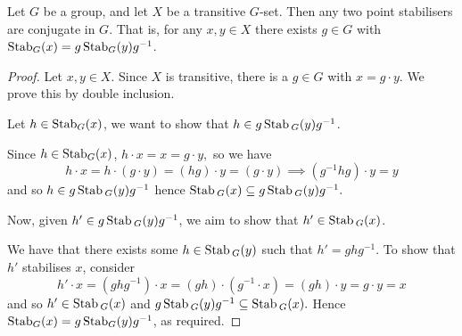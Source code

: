 \begin{theorem}
  Let $G$ be a group, and let $X$ be a transitive $G$-set. Then any two point stabilisers are conjugate in $G$. That is, for any $x,y\in X$ there exists $g\in G$ with
  $\operatorname*{Stab}_G(x)=g\operatorname*{Stab}_G(y)g^{-1}$.
  \label{conjugatestab}
\end{theorem}
\begin{proof}
  Let $x,y \in X$. Since $X$ is transitive, there is a $g\in G$ with $x=g \cdot y$. We prove this by double inclusion.
  
 Let $h\in\operatorname*{Stab}_G(x)$, we want to show that $h\in g\operatorname*{Stab}{}_G(y)g^{-1}$.
  
  Since $h \in \operatorname*{Stab}_G(x)$, $h\cdot x=x=g\cdot y,$ so we have
  $$
  h \cdot x = h \cdot (g \cdot y) = (hg) \cdot y = (g \cdot y) \implies (g^{-1}hg) \cdot y = y  
  $$
  and so $h \in g\operatorname*{Stab}{}_G(y)g^{-1}$ hence $\operatorname*{Stab}{}_G(x) \subseteq g\operatorname*{Stab}{}_G(y)g^{-1}.$

  


 Now, given $h' \in g\operatorname*{Stab}{}_G(y)g^{-1}$, we aim to show that $h' \in \operatorname*{Stab}{}_G(x)$.

We have that there exists some $h \in \operatorname*{Stab}{}_G(y)$ such that $h' = ghg^{-1}$. To show that $h'$ stabilises $x$, consider
$$
h' \cdot x = (ghg^{-1}) \cdot x = (gh) \cdot (g^{-1} \cdot x) = (gh) \cdot y = g \cdot y = x
$$
and so $h' \in \operatorname*{Stab}{}_G(x)$ and  $g\operatorname*{Stab}{}_G(y)g^{-1} \subseteq \operatorname*{Stab}{}_G(x).$ Hence $\operatorname*{Stab}_G(x)=g\operatorname*{Stab}_G(y)g^{-1}$, as required.
\end{proof}

